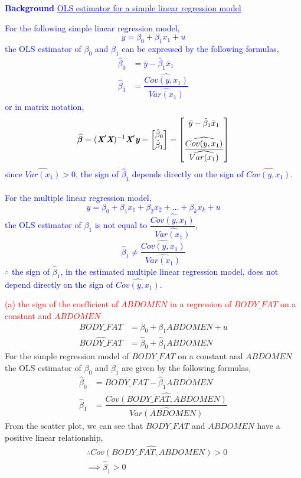 \documentclass[12pt]{report}
\newenvironment{blueframed}[1][blue]
{\def\FrameCommand{\fboxsep=\FrameSep\fcolorbox{#1}{white}}%
	\MakeFramed {\advance\hsize-\width \FrameRestore}}
{\endMakeFramed}
\begin{document}
\justify
\begin{blueframed}
	\textcolor{blue}{\textbf{Background}}
	\vspace{-\baselineskip}
	\justify
	\textcolor{blue}{\underline{OLS estimator for a simple linear regression model}}
	
	\noindent \textcolor{blue}
	{
		\noindent For the following simple linear regression model, $$y = \beta_0 + \beta_1 x_1 + u$$  the OLS estimator of $\beta_0$ and $\beta_1$ can be expressed by the following formulas,
		\begin{align*}
		\hat{\beta}_0 &= \bar{y} - \hat{\beta}_1\bar{x}_1 \\
		\hat{\beta}_1 &= \dfrac{\widehat{Cov(y,x_1)}}{\widehat{Var(x_1)}}
		\end{align*}
		or in matrix notation, $$\widehat{\boldsymbol{\beta}} 
		= (\textit{\textbf{X}}'\textit{\textbf{X}})^{-1}\textit{\textbf{X}}'\textit{\textbf{y}}
		=
		\begin{bmatrix}
		\hat{\beta}_0 \\
		\hat{\beta}_1 
		\end{bmatrix}
		=
		\begin{bmatrix}
		\bar{y} - \hat{\beta}_1\bar{x}_1 \\[10pt]
		\dfrac{\widehat{Cov(y,x_1)}}{\widehat{Var(x_1)}} 
		\end{bmatrix}$$
		since $\widehat{Var(x_1)}>0$, the sign of $\hat{\beta}_1$ depends directly on the sign of $\widehat{Cov(y,x_1)}$. \\ \\ For the multiple linear regression model, $$y = \beta_0 + \beta_1 x_1 + \beta_2 x_2 + \dots + \beta_k x_k + u$$ the OLS estimator of $\beta_1$ is not equal to $\dfrac{\widehat{Cov(y,x_1)}}{\widehat{Var(x_1)}}$, $$\hat{\beta}_1 \neq \dfrac{\widehat{Cov(y,x_1)}}{\widehat{Var(x_1)}}$$ $\therefore$ the sign of $\hat{\beta}_1$, in the estimated multiple linear regression model, does not depend directly on the sign of $\widehat{Cov(y,x_1)}$.
}\end{blueframed}

\noindent \textcolor{red}{(a) the sign of the coefficient of $ABDOMEN$ in a regression of $BODY\_FAT$ on a constant and $ABDOMEN$}
\begin{align*}
	BODY\_FAT &= \beta_0 + \beta_1 ABDOMEN + u \\
	\widehat{BODY\_FAT} &= \hat{\beta}_0 + \hat{\beta}_1 ABDOMEN
\end{align*}
\noindent For the simple regression model of $BODY\_FAT$ on a constant and $ABDOMEN$ the OLS estimator of $\beta_0$ and $\beta_1$ are given by the following formulas,
\begin{align*}
	\hat{\beta}_0 &= \overline{BODY\_FAT} - \hat{\beta}_1\overline{ABDOMEN} \\
	\hat{\beta}_1 &= \dfrac{\widehat{Cov(BODY\_FAT,ABDOMEN)}}{\widehat{Var(ABDOMEN)}}
\end{align*}
\noindent From the scatter plot, we can see that $BODY\_FAT$ and $ABDOMEN$ have a positive linear relationship, 
\begin{align*}
	&\therefore \widehat{Cov(BODY\_FAT,ABDOMEN)}>0 \\
	&\implies \hat{\beta}_1 > 0
\end{align*}
\end{document}
